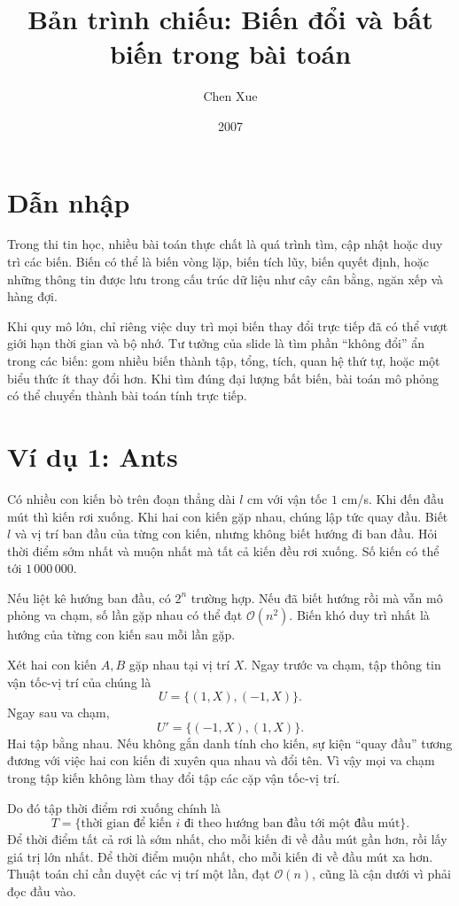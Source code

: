\documentclass[11pt]{article}
\title{Bản trình chiếu: Biến đổi và bất biến trong bài toán}
\author{Chen Xue}
\date{2007}
\newcommand{\Oh}{\mathcal{O}}
\begin{document}
\maketitle


\section{Dẫn nhập}

Trong thi tin học, nhiều bài toán thực chất là quá trình tìm, cập nhật hoặc
duy trì các biến. Biến có thể là biến vòng lặp, biến tích lũy, biến quyết
định, hoặc những thông tin được lưu trong cấu trúc dữ liệu như cây cân bằng,
ngăn xếp và hàng đợi.

Khi quy mô lớn, chỉ riêng việc duy trì mọi biến thay đổi trực tiếp đã có thể
vượt giới hạn thời gian và bộ nhớ. Tư tưởng của slide là tìm phần ``không
đổi'' ẩn trong các biến: gom nhiều biến thành tập, tổng, tích, quan hệ thứ
tự, hoặc một biểu thức ít thay đổi hơn. Khi tìm đúng đại lượng bất biến, bài
toán mô phỏng có thể chuyển thành bài toán tính trực tiếp.

\section{Ví dụ 1: Ants}

Có nhiều con kiến bò trên đoạn thẳng dài \(l\) cm với vận tốc \(1\) cm/s. Khi
đến đầu mút thì kiến rơi xuống. Khi hai con kiến gặp nhau, chúng lập tức quay
đầu. Biết \(l\) và vị trí ban đầu của từng con kiến, nhưng không biết hướng
đi ban đầu. Hỏi thời điểm sớm nhất và muộn nhất mà tất cả kiến đều rơi xuống.
Số kiến có thể tới \(1\,000\,000\).

Nếu liệt kê hướng ban đầu, có \(2^n\) trường hợp. Nếu đã biết hướng rồi mà
vẫn mô phỏng va chạm, số lần gặp nhau có thể đạt \(\Oh(n^2)\). Biến khó duy
trì nhất là hướng của từng con kiến sau mỗi lần gặp.

Xét hai con kiến \(A,B\) gặp nhau tại vị trí \(X\). Ngay trước va chạm, tập
thông tin vận tốc-vị trí của chúng là
\[
  U=\{(1,X),(-1,X)\}.
\]
Ngay sau va chạm,
\[
  U'=\{(-1,X),(1,X)\}.
\]
Hai tập bằng nhau. Nếu không gắn danh tính cho kiến, sự kiện ``quay đầu''
tương đương với việc hai con kiến đi xuyên qua nhau và đổi tên. Vì vậy mọi
va chạm trong tập kiến không làm thay đổi tập các cặp vận tốc-vị trí.

Do đó tập thời điểm rơi xuống chính là
\[
  T=\{\text{thời gian để kiến }i\text{ đi theo hướng ban đầu tới một đầu mút}\}.
\]
Để thời điểm tất cả rơi là sớm nhất, cho mỗi kiến đi về đầu mút gần hơn, rồi
lấy giá trị lớn nhất. Để thời điểm muộn nhất, cho mỗi kiến đi về đầu mút xa
hơn. Thuật toán chỉ cần duyệt các vị trí một lần, đạt \(\Oh(n)\), cũng là
cận dưới vì phải đọc đầu vào.
\end{document}
